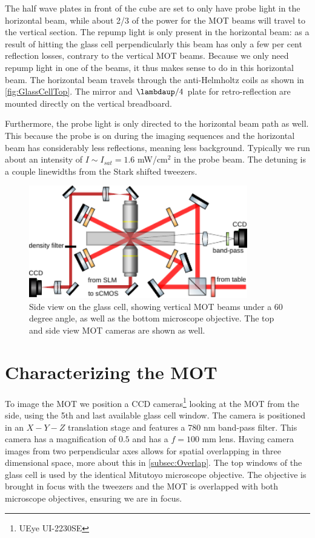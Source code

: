 The half wave plates in front of the cube are set to only have probe light in the horizontal beam, while about 2/3 of the power for the MOT beams will travel to the vertical section. 
The repump light is only present in the horizontal beam: as a result of hitting the glass cell perpendicularly this beam has only a few per cent reflection losses, contrary to the vertical MOT beams. 
Because we only need repump light in one of the beams, it thus makes sense to do in this horizontal beam. 
The horizontal beam travels through the anti-Helmholtz coils as shown in \cref{fig:GlassCellTop}.
The mirror and $\lambdaup/4$ plate for retro-reflection are mounted directly on the vertical breadboard. 

Furthermore, the probe light is only directed to the horizontal beam path as well. 
This because the probe is on during the imaging sequences and the horizontal beam has considerably less reflections, meaning less background. 
Typically we run about an intensity of $I \sim I_{sat} =1.6$ mW/cm${}^2$ in the probe beam.
The detuning is a couple linewidths from the Stark shifted tweezers. 

\begin{figure}
    \centering
    \includegraphics[width=0.85\textwidth]{figures/MOTsideview.pdf}
    \caption{Side view on the glass cell, showing vertical MOT beams under a 60 degree angle, as well as the bottom microscope objective. 
    The top and side view MOT cameras are shown as well.}
    \label{fig:GlassCellSide}
\end{figure}


\section{Characterizing the MOT}\label{sec:MOTresult}

To image the MOT we position a CCD cameras\footnote{UEye UI-2230SE} looking at the MOT from the side, using the 5th and last available glass cell window. 
The camera is positioned in an $X-Y-Z$ translation stage and features a 780 nm band-pass filter. 
This camera has a magnification of $0.5$ and has a $f=100$ mm lens. 
Having camera images from two perpendicular axes allows for spatial overlapping in three dimensional space, more about this in \cref{subsec:Overlap}.
The top windows of the glass cell is used by the identical Mitutoyo microscope objective. 
The objective is brought in focus with the tweezers and the MOT is overlapped with both microscope objectives, ensuring we are in focus.


